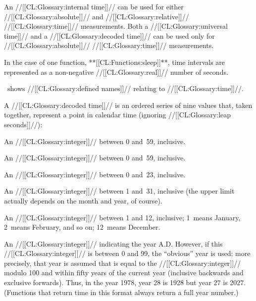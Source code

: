 An //[[CL:Glossary:internal time]]// can be used 
  for either //[[CL:Glossary:absolute]]// and //[[CL:Glossary:relative]]// //[[CL:Glossary:time]]// measurements. Both a //[[CL:Glossary:universal time]]// and a //[[CL:Glossary:decoded time]]// can be used 
  only for //[[CL:Glossary:absolute]]// //[[CL:Glossary:time]]// measurements.

In the case of one function, **[[CL:Functions:sleep]]**, time intervals are represented as a non-negative //[[CL:Glossary:real]]// number of seconds.

\Thenextfigure\ shows //[[CL:Glossary:defined names]]// relating to //[[CL:Glossary:time]]//.


 

A //[[CL:Glossary:decoded time]]// is an ordered series of nine values that, taken together, represent a point in calendar time (ignoring //[[CL:Glossary:leap seconds]]//):

\beginlist {}

An //[[CL:Glossary:integer]]// between 0 and~59, inclusive.


An //[[CL:Glossary:integer]]// between 0 and~59, inclusive.


An //[[CL:Glossary:integer]]// between 0 and~23, inclusive.


An //[[CL:Glossary:integer]]// between 1 and~31, inclusive (the upper limit actually depends on the month and year, of course).


An //[[CL:Glossary:integer]]// between 1 and 12, inclusive; 1~means January, 2~means February, and so on; 12~means December.


An //[[CL:Glossary:integer]]// indicating the year A.D.  However, if this  //[[CL:Glossary:integer]]// is between 0 and 99, the ``obvious'' year is used; more precisely, that year is assumed that is equal to the  //[[CL:Glossary:integer]]// modulo 100 and within fifty years of the current year (inclusive backwards and exclusive forwards).   Thus, in the year 1978, year 28 is 1928 but year 27 is 2027.  (Functions that return time in this format always return a full year number.) 

